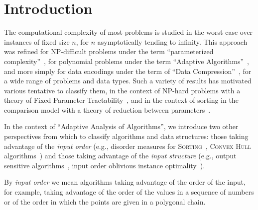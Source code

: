 \section{Introduction}
\label{sec:intro}


The computational complexity of most problems is studied in the worst
case over instances of fixed size $n$, for $n$ asymptotically tending
to infinity. This approach was refined for NP-difficult problems under
the term ``parameterized
complexity''~\cite{2006-BOOK-ParameterizedComplexityTheory-FlumGrohe},
for polynomial problems under the term ``Adaptive
Algorithms''~\cite{1992-ACMCS-ASurveyOfAdaptiveSortingAlgorithms-EstivillCastroWood,1992-ACJ-AnOverviewOfAdaptiveSorting-MoffatPetersson},
and more simply for data encodings under the term of ``Data
Compression''~\cite{2013-TCS-OnCompressingPermutationsAndAdaptiveSorting-BarbayNavarro},
for a wide range of problems and data types.
Such a variety of results has motivated various tentative to classify
them, in the context of NP-hard problems with a theory of Fixed
Parameter
Tractability~\cite{2006-BOOK-ParameterizedComplexityTheory-FlumGrohe},
and in the context of sorting in the comparison model with a theory of
reduction between
parameters~\cite{1995-DAM-AFrameworkForAdaptiveSorting-PeterssonMoffat}.


In the context of ``Adaptive Analysis of Algorithms'', we introduce
two other perspectives from which to classify algorithms and data
structures: those taking advantage of the \emph{input order} (e.g.,
disorder measures for
\textsc{Sorting}~\cite{1992-ACJ-AnOverviewOfAdaptiveSorting-MoffatPetersson,1992-ACMCS-ASurveyOfAdaptiveSortingAlgorithms-EstivillCastroWood},
\textsc{Convex Hull}
algorithms~\cite{2002-SWAT-AdaptiveAlgorithmsForConstructingConvexHullsAndTriangulationsOfPolygonalChains-LevcopoulosLingasMitchell})
and those taking advantage of the \emph{input structure} (e.g., output
sensitive
algorithms~\cite{1986-JCom-TheUltimatePlanarConvexHullAlgorithm-KirkpatrickSeidel},
input order oblivious instance
optimality~\cite{2009-FOCS-InstanceOptimalGeometricAlgorithms-AfshaniBarbayChan}).

By \emph{input order} we mean algorithms taking advantage of the order
of the input, for example, taking advantage of the order of the values
in a sequence of numbers or of the order in which the points are given
in a polygonal chain.

